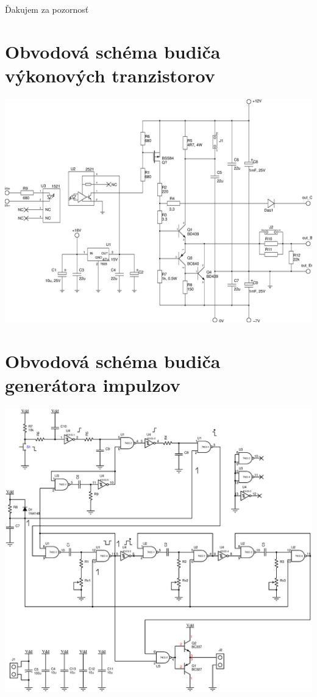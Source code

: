 \documentclass[oneside]{article}
\begin{document}
\section*{}
\newpage
\centering
\newpage
\vspace{60pt}
Ďakujem za pozornosť


\appendix

\section{Obvodová schéma budiča výkonových tranzistorov}
\hspace{-1.8cm}\includegraphics[height=.8\textheight]{../obr/schema_budic2}

\section{Obvodová schéma budiča generátora impulzov}
\hspace{-1.8cm}\includegraphics[height=.8\textheight]{../obr/schema_gen}


\label{LastPage}
\end{document}
